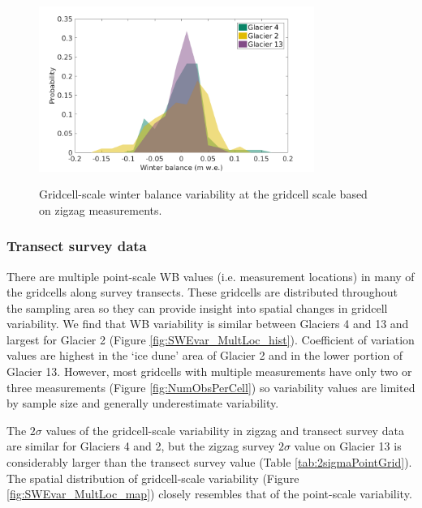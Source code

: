 \documentclass{sfuthesis}
\begin{document}
\begin{figure}
	\centering
	\includegraphics[width =0.8\textwidth]{ZigzagPDF_G.png}\\
	\caption{Gridcell-scale winter balance variability at the gridcell scale based on zigzag measurements.}
	\label{fig:SWEvar_ZZG_hist}
\end{figure}

\subsubsection{Transect survey data}
There are multiple point-scale WB values (i.e. measurement locations) in many of the gridcells along survey transects. These gridcells are distributed throughout the sampling area so they can provide insight into spatial changes in gridcell variability. We find that WB variability is similar between Glaciers 4 and 13 and largest for Glacier 2 (Figure \ref{fig:SWEvar_MultLoc_hist}). Coefficient of variation values are highest in the `ice dune' area of Glacier 2 and in the lower portion of Glacier 13.  However, most gridcells with multiple measurements have only two or three measurements (Figure \ref{fig:NumObsPerCell}) so variability values are limited by sample size and generally underestimate variability. 

The $2\sigma$ values of the gridcell-scale variability in zigzag and transect survey data are similar for Glaciers 4 and 2, but the zigzag survey $2\sigma$ value on Glacier 13 is considerably larger than the transect survey value (Table  \ref{tab:2sigmaPointGrid}). The spatial distribution of gridcell-scale variability (Figure \ref{fig:SWEvar_MultLoc_map}) closely resembles that of the point-scale variability. 
\end{document}
